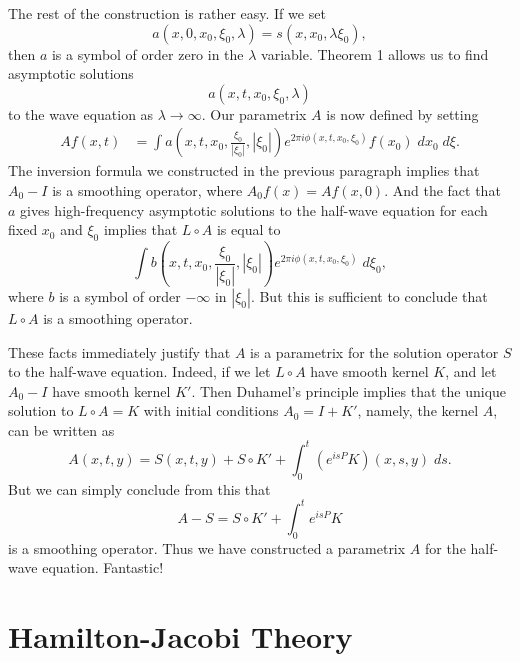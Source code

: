 \documentclass{article}
\theoremstyle{plain}
\theoremstyle{remark}
\theoremstyle{definition}
\begin{document}
The rest of the construction is rather easy. If we set
%
\[ a(x,0,x_0,\xi_0,\lambda) = s( x, x_0, \lambda \xi_0 ), \]
%
then $a$ is a symbol of order zero in the $\lambda$ variable. Theorem 1 allows us to find asymptotic solutions
%
\[ a(x,t,x_0,\xi_0,\lambda) \]
%
to the wave equation as $\lambda \to \infty$. Our parametrix $A$ is now defined by setting
%
\begin{align*}
	Af(x,t) &= \int a \left( x, t, x_0, \frac{\xi_0}{|\xi_0|} , |\xi_0| \right) e^{2 \pi i \phi(x,t,x_0,\xi_0)} f(x_0)\; dx_0\; d\xi.
\end{align*}
%
The inversion formula we constructed in the previous paragraph implies that $A_0 - I$ is a smoothing operator, where $A_0 f(x) = Af(x,0)$. And the fact that $a$ gives high-frequency asymptotic solutions to the half-wave equation for each fixed $x_0$ and $\xi_0$ implies that $L \circ A$ is equal to
%
\[ \int b \left( x, t, x_0, \frac{\xi_0}{|\xi_0|} , |\xi_0| \right) e^{2 \pi i \phi(x,t,x_0,\xi_0)}\; d\xi_0, \]
%
where $b$ is a symbol of order $-\infty$ in $|\xi_0|$. But this is sufficient to conclude that $L \circ A$ is a smoothing operator.

These facts immediately justify that $A$ is a parametrix for the solution operator $S$ to the half-wave equation. Indeed, if we let $L \circ A$ have smooth kernel $K$, and let $A_0 - I$ have smooth kernel $K'$. Then Duhamel's principle implies that the unique solution to $L \circ A = K$ with initial conditions $A_0 = I + K'$, namely, the kernel $A$, can be written as
%
\[ A(x,t,y) = S(x,t,y) + S \circ K' + \int_0^t (e^{isP} K)(x,s,y)\; ds. \]
%
But we can simply conclude from this that
%
\[ A - S = S \circ K' + \int_0^t e^{isP} K \]
%
is a smoothing operator. Thus we have constructed a parametrix $A$ for the half-wave equation. Fantastic!

\section{Hamilton-Jacobi Theory}
\end{document}
